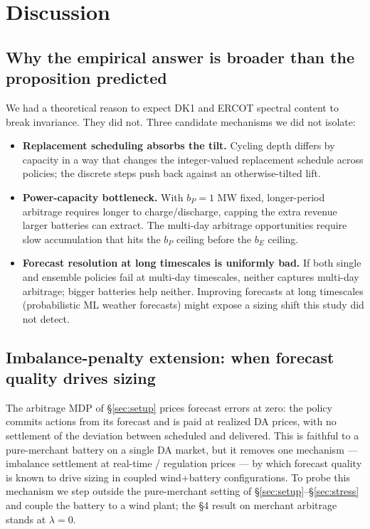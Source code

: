 \documentclass[11pt]{article}
\begin{document}
\section{Discussion}\label{sec:discussion}

\subsection{Why the empirical answer is broader than the proposition predicted}

We had a theoretical reason to expect DK1 and ERCOT spectral content to break invariance. They did not. Three candidate mechanisms we did not isolate:

\begin{itemize}
\item \textbf{Replacement scheduling absorbs the tilt.} Cycling depth differs by capacity in a way that changes the integer-valued replacement schedule across policies; the discrete steps push back against an otherwise-tilted lift.
\item \textbf{Power-capacity bottleneck.} With $b_P = 1$ MW fixed, longer-period arbitrage requires longer to charge/discharge, capping the extra revenue larger batteries can extract. The multi-day arbitrage opportunities require slow accumulation that hits the $b_P$ ceiling before the $b_E$ ceiling.
\item \textbf{Forecast resolution at long timescales is uniformly bad.} If both single and ensemble policies fail at multi-day timescales, neither captures multi-day arbitrage; bigger batteries help neither. Improving forecasts at long timescales (probabilistic ML weather forecasts) might expose a sizing shift this study did not detect.
\end{itemize}

\subsection{Imbalance-penalty extension: when forecast quality drives sizing}\label{sec:imbalance}

The arbitrage MDP of \S\ref{sec:setup} prices forecast errors at zero: the policy commits actions from its forecast and is paid at realized DA prices, with no settlement of the deviation between scheduled and delivered. This is faithful to a pure-merchant battery on a single DA market, but it removes one mechanism --- imbalance settlement at real-time / regulation prices --- by which forecast quality is known to drive sizing in coupled wind+battery configurations. To probe this mechanism we step outside the pure-merchant setting of \S\ref{sec:setup}--\S\ref{sec:stress} and couple the battery to a wind plant; the §4 result on merchant arbitrage stands at $\lambda = 0$.
\end{document}

